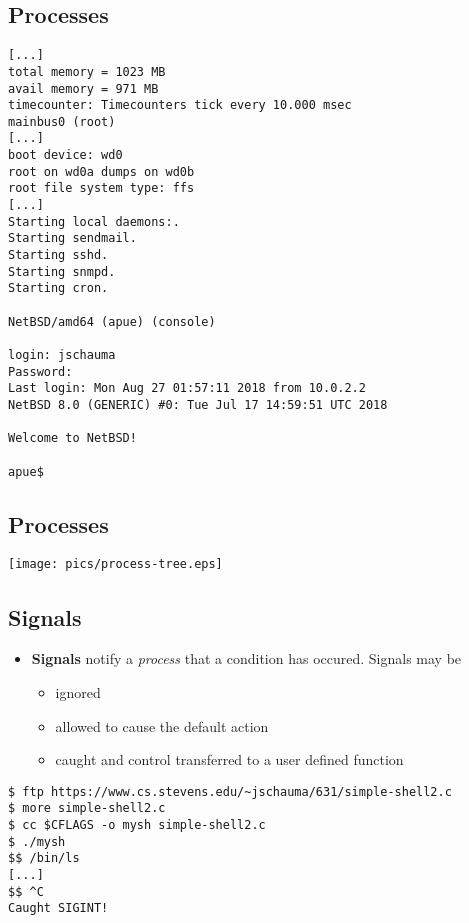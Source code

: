 \documentclass[sxga]{xdvislides}
\begin{document}
\subsection{Processes}
\small
\begin{verbatim}
[...]
total memory = 1023 MB
avail memory = 971 MB
timecounter: Timecounters tick every 10.000 msec
mainbus0 (root)
[...]
boot device: wd0
root on wd0a dumps on wd0b
root file system type: ffs
[...]
Starting local daemons:.
Starting sendmail.
Starting sshd.
Starting snmpd.
Starting cron.

NetBSD/amd64 (apue) (console)

login: jschauma
Password:
Last login: Mon Aug 27 01:57:11 2018 from 10.0.2.2
NetBSD 8.0 (GENERIC) #0: Tue Jul 17 14:59:51 UTC 2018

Welcome to NetBSD!

apue$
\end{verbatim}
\Normalsize



\subsection{Processes}
\begin{center}
\texttt{[image: pics/process-tree.eps]} \\
\end{center}

\subsection{Signals}
\begin{itemize}
	\item	{\bf Signals} notify a {\em process} that a condition
			has occured. Signals may be
		\begin{itemize}
			\item ignored
			\item allowed to cause the default action
			\item caught and control transferred to a user defined function
		\end{itemize}
\end{itemize}
\vspace*{\fill}
\begin{center}
\begin{verbatim}
$ ftp https://www.cs.stevens.edu/~jschauma/631/simple-shell2.c
$ more simple-shell2.c
$ cc $CFLAGS -o mysh simple-shell2.c
$ ./mysh
$$ /bin/ls
[...]
$$ ^C
Caught SIGINT!
\end{verbatim}
\end{center}
\vspace*{\fill}
\end{document}
